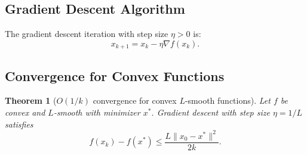 \documentclass[11pt,a4paper]{article}
\theoremstyle{definition}
\theoremstyle{plain}
\newtheorem{theorem}{Theorem}[section]
\theoremstyle{remark}
\begin{document}
\subsection{Gradient Descent Algorithm}

The gradient descent iteration with step size $\eta > 0$ is:
\begin{equation}\label{eq:gd}
  x_{k+1} = x_k - \eta \nabla f(x_k).
\end{equation}

\subsection{Convergence for Convex Functions}

\begin{theorem}[$O(1/k)$ convergence for convex $L$-smooth functions]%
\label{thm:gd-convex}
Let $f$ be convex and $L$-smooth with minimizer $x^*$. Gradient descent with
step size $\eta = 1/L$ satisfies
\begin{equation}\label{eq:gd-convex-rate}
  f(x_k) - f(x^*) \le \frac{L \|x_0 - x^*\|^2}{2k}.
\end{equation}
\end{theorem}
\end{document}
